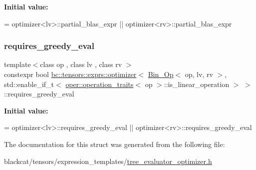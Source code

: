 {\bfseries Initial value\+:}
\begin{DoxyCode}
=
            optimizer<lv>::partial\_blas\_expr ||
            optimizer<rv>::partial\_blas\_expr
\end{DoxyCode}
\mbox{\label{structbc_1_1tensors_1_1exprs_1_1optimizer_3_01Bin__Op_3_01op_00_01lv_00_01rv_01_4_00_01std_1_1en0dcf27d7e2238f62469eab81d847c552_ada62f3b41168a9944040c721e109beed}} 
\subsubsection{\texorpdfstring{requires\+\_\+greedy\+\_\+eval}{requires\_greedy\_eval}}
{\footnotesize\ttfamily template$<$class op , class lv , class rv $>$ \\
constexpr bool \hyperlink{structbc_1_1tensors_1_1exprs_1_1optimizer}{bc\+::tensors\+::exprs\+::optimizer}$<$ \hyperlink{structbc_1_1tensors_1_1exprs_1_1Bin__Op}{Bin\+\_\+\+Op}$<$ op, lv, rv $>$, std\+::enable\+\_\+if\+\_\+t$<$ \hyperlink{structbc_1_1oper_1_1operation__traits}{oper\+::operation\+\_\+traits}$<$ op $>$\+::is\+\_\+linear\+\_\+operation $>$ $>$\+::requires\+\_\+greedy\+\_\+eval\hspace{0.3cm}{\ttfamily [static]}}

{\bfseries Initial value\+:}
\begin{DoxyCode}
=
            optimizer<lv>::requires\_greedy\_eval ||
            optimizer<rv>::requires\_greedy\_eval
\end{DoxyCode}


The documentation for this struct was generated from the following file\+:\begin{DoxyCompactItemize}
\item 
blackcat/tensors/expression\+\_\+templates/\hyperlink{tree__evaluator__optimizer_8h}{tree\+\_\+evaluator\+\_\+optimizer.\+h}\end{DoxyCompactItemize}
